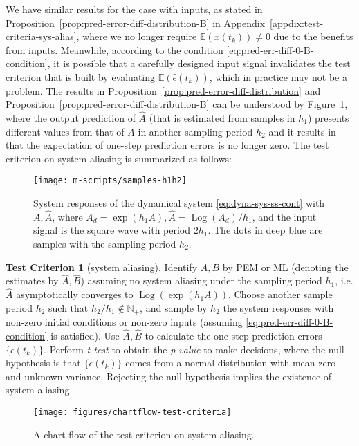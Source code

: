 \documentclass[letterpaper,10pt,journal,final]{IEEEtran}
\theoremstyle{definition}
\newtheorem*{criteria}{Test Criterion}
\theoremstyle{remark}
\newcommand{\Log}{\operatorname{Log}}
\begin{document}
We have similar results for the case with inputs, as stated in
Proposition~\ref{prop:pred-error-diff-distribution-B} in
Appendix~\ref{appdix:test-criteria-sys-alias}, where we no longer require
$\mathbb{E}(x(t_k)) \neq 0$ due to the benefits from inputs. Meanwhile, according to
the condition \eqref{eq:pred-err-diff-0-B-condition}, it is possible that a carefully
designed input signal invalidates the test criterion that is built by evaluating
$\mathbb{E}(\hat{\epsilon}(t_k))$, which in practice may not be a problem.
The results in Proposition~\ref{prop:pred-error-diff-distribution} and
Proposition~\ref{prop:pred-error-diff-distribution-B} can be understood by
Figure~\ref{fig:samples-diff-h1h2}, where the output prediction of $\hat{A}$ (that is
estimated from samples in $h_1$) presents different values from that of $A$ in
another sampling period $h_2$ and it results in that the expectation of one-step
prediction errors is no longer zero.  The test criterion on system aliasing is
summarized as follows:
\begin{figure}[htb]   \centering
  \texttt{[image: m-scripts/samples-h1h2]}
  \caption{System responses of the dynamical system \eqref{eq:dyna-sys-ss-cont} with
    $A, \hat{A}$, where $A_d = \exp(h_1A), \hat{A} = \Log(A_d)/h_1$, and the input
    signal is the square wave with period $2h_1$. The dots in deep
    blue are samples with the sampling period $h_2$.}
  \label{fig:samples-diff-h1h2}
\end{figure}

\begin{criteria}[system aliasing]
  Identify $A, B$ by PEM or ML (denoting the estimates by $\hat{A}, \hat{B}$)
  assuming no system aliasing under the sampling period $h_1$, i.e. $\hat{A}$
  asymptotically converges to $\Log(\exp(h_1A))$.  Choose another sample period $h_2$
  such that $h_2/h_1 \notin \mathbb{N}_+$, and sample by $h_2$ the system responses
  with non-zero initial conditions or non-zero inputs (assuming
  \eqref{eq:pred-err-diff-0-B-condition} is satisfied). Use $\hat{A}, \hat{B}$ to
  calculate the one-step prediction errors $\{\epsilon(t_k)\}$. Perform \emph{t-test} to
  obtain the \emph{p-value} to make decisions, where the null hypothesis is that
  $\{\epsilon(t_k)\}$ comes from a normal distribution with mean zero and unknown
  variance. Rejecting the null hypothesis implies the existence of system aliasing.
\end{criteria}

\begin{figure}[htbp]   \centering
  \texttt{[image: figures/chartflow-test-criteria]}
  \caption{A chart flow of the test criterion on system aliasing.}
  \label{fig:chartflow-test-criteria}
\end{figure}
\end{document}

